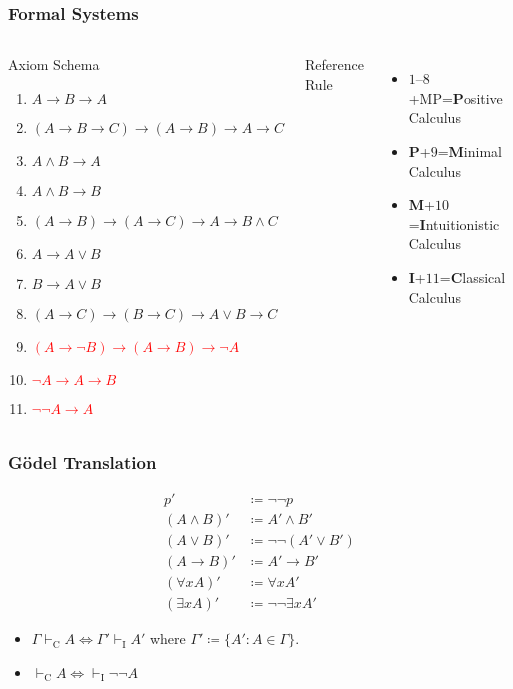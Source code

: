 \documentclass[UTF8,11pt,colorlinks,compress,openany]{beamer}%
\begin{document}
\begin{frame}\frametitle{Formal Systems}
	\begin{columns}
			\begin{block}{Axiom Schema}
				\begin{enumerate}
					\item $A\to B\to A$
					\item $(A\to B\to C)\to(A\to B)\to A\to C$
					\item $A\wedge B\to A$
					\item $A\wedge B\to B$
					\item $(A\to B)\to(A\to C)\to A\to B\wedge C$
					\item $A\to A\vee B$
					\item $B\to A\vee B$
					\item $(A\to C)\to(B\to C)\to A\vee B\to C$
					\item \textcolor{red}{$(A\to\neg B)\to(A\to B)\to\neg A$}
					\item \textcolor{red}{$\neg A\to A\to B$}
					\item \textcolor{red}{$\neg\neg A\to A$}
				\end{enumerate}
			\end{block}
			\begin{block}{Reference Rule}
				\begin{prooftree}
					\alwaysSingleLine
					\RightLabel{\textcolor{yellow}{[MP]}}
				\end{prooftree}
			\end{block}
\begin{itemize}\small
	\item $1$--$8$+MP=\textbf{P}ositive Calculus
	\item \textbf{P}+$9$=\textbf{M}inimal Calculus
	\item	\textbf{M}+$10$=\textbf{I}ntuitionistic Calculus
	\item \textbf{I}+$11$=\textbf{C}lassical Calculus
\end{itemize}
	\end{columns}
\end{frame}

\begin{frame}\frametitle{G\"odel Translation}
\begin{align*}
p'&\coloneqq \neg\neg p\\
(A\wedge B)'&\coloneqq A'\wedge B'\\
(A\vee B)' &\coloneqq\neg\neg(A'\vee B')\\
(A\to B)' &\coloneqq A'\to B'\\
(\forall xA)' &\coloneqq \forall xA'\\
(\exists xA)' &\coloneqq\neg\neg\exists x A'
\end{align*}
\begin{itemize}
	\item $\Gamma\vdash_{\mathrm{C}} A\iff\Gamma'\vdash_{\mathrm{I}} A'$ where $\Gamma'\coloneqq \{A': A\in\Gamma\}$.
	\item $\vdash_{\mathrm{C}} A\iff\vdash_{\mathrm{I}} \neg\neg A$
\end{itemize}
\end{frame}
\end{document}

